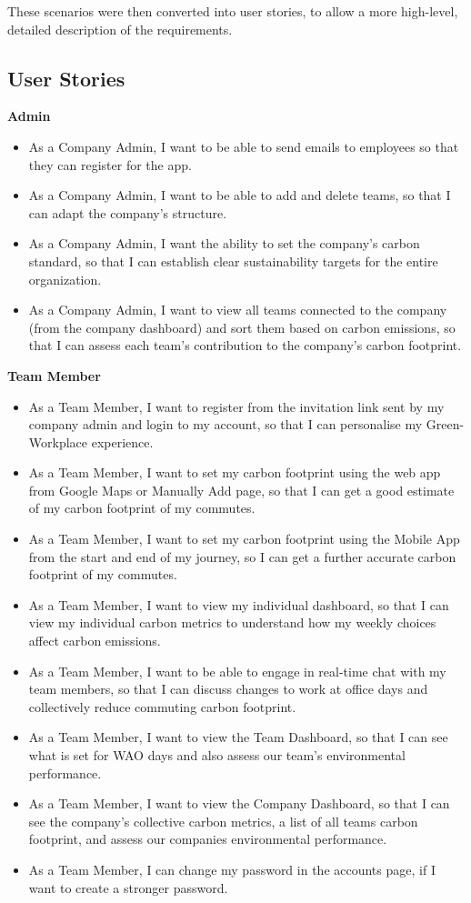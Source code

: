 \documentclass{l4proj}
\begin{document}
These scenarios were then converted into user stories, to allow a more high-level, detailed description of the requirements.

\subsection{User Stories}
\textbf{Admin}
\begin{itemize}
    \item As a Company Admin, I want to be able to send emails to employees so that they can register for the app.
    \item As a Company Admin, I want to be able to add and delete teams, so that I can adapt the company's structure.
    \item As a Company Admin, I want the ability to set the company's carbon standard, so that I can establish clear sustainability targets for the entire organization.
    \item As a Company Admin, I want to view all teams connected to the company (from the company dashboard) and sort them based on carbon emissions, so that I can assess each team's contribution to the company's carbon footprint.
\end{itemize}

\textbf{Team Member}
\begin{itemize}
    \item As a Team Member, I want to register from the invitation link sent by my company admin and login to my account, so that I can personalise my Green-Workplace experience.
    \item As a Team Member, I want to set my carbon footprint using the web app from Google Maps or Manually Add page, so that I can get a good estimate of my carbon footprint of my commutes.
    \item As a Team Member, I want to set my carbon footprint using the Mobile App from the start and end of my journey, so I can get a further accurate carbon footprint of my commutes.
    \item As a Team Member, I want to view my individual dashboard, so that I can view my individual carbon metrics to understand how my weekly choices affect carbon emissions.
    \item As a Team Member, I want to be able to engage in real-time chat with my team members, so that I can discuss changes to work at office days and collectively reduce commuting carbon footprint.
    \item As a Team Member, I want to view the Team Dashboard, so that I can see what is set for WAO days and also assess our team's environmental performance.
    \item As a Team Member, I want to view the Company Dashboard, so that I can see the company's collective carbon metrics, a list of all teams carbon footprint, and assess our companies environmental performance.
    \item As a Team Member, I can change my password in the accounts page, if I want to create a stronger password.
\end{itemize}
\end{document}
